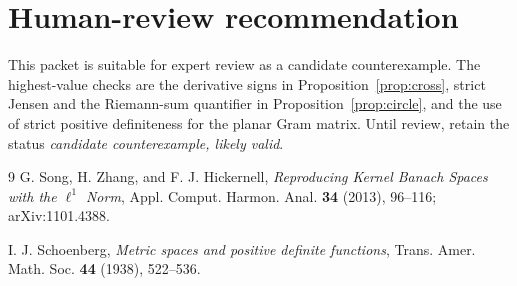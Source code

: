 \documentclass[11pt]{article}
\begin{document}
\section{Human-review recommendation}

This packet is suitable for expert review as a candidate counterexample.
The highest-value checks are the derivative signs in
Proposition~\ref{prop:cross}, strict Jensen and the Riemann-sum quantifier in
Proposition~\ref{prop:circle}, and the use of strict positive definiteness for
the planar Gram matrix.  Until review, retain the status
\emph{candidate counterexample, likely valid}.

\begin{thebibliography}{9}
G. Song, H. Zhang, and F. J. Hickernell,
\emph{Reproducing Kernel Banach Spaces with the $\ell^1$ Norm},
Appl. Comput. Harmon. Anal. \textbf{34} (2013), 96--116;
arXiv:1101.4388.

I. J. Schoenberg,
\emph{Metric spaces and positive definite functions},
Trans. Amer. Math. Soc. \textbf{44} (1938), 522--536.
\end{thebibliography}
\end{document}
